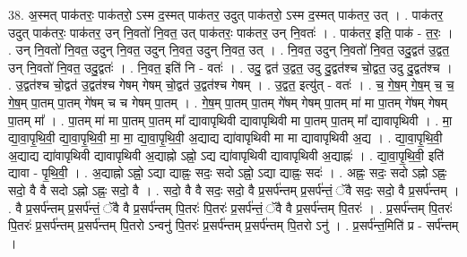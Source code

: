 \documentclass[17pt]{extarticle}
\begin{document}
38. अ॒स्मत् पाक॑तरः॒ पाक॑तरो॒ ऽस्म द॒स्मत् पाक॑तर॒ उदुत् पाक॑तरो॒ ऽस्म द॒स्मत् पाक॑तर॒ उत् । . पाक॑तर॒ उदुत् पाक॑तरः॒ पाक॑तर॒ उन् नि॒वतो॑ नि॒वत॒ उत् पाक॑तरः॒ पाक॑तर॒ उन् नि॒वतः॑ । . पाक॑तर॒ इति॒ पाक॑ - त॒रः॒ । . उन् नि॒वतो॑ नि॒वत॒ उदुन् नि॒वत॒ उदुन् नि॒वत॒ उदुन् नि॒वत॒ उत् । . नि॒वत॒ उदुन् नि॒वतो॑ नि॒वत॒ उदु॒द्वत॑ उ॒द्वत॒ उन् नि॒वतो॑ नि॒वत॒ उदु॒द्वतः॑ । . नि॒वत॒ इति॑ नि - वतः॑ । . उदु॒ द्वत॑ उ॒द्वत॒ उदु दु॒द्वत॑श्च चो॒द्वत॒ उदु दु॒द्वत॑श्च । . उ॒द्वत॑श्च चो॒द्वत॑ उ॒द्वत॑श्च गेषम् गेषम् चो॒द्वत॑ उ॒द्वत॑श्च गेषम् । . उ॒द्वत॒ इत्यु॑त् - वतः॑ । . च॒ गे॒ष॒म् गे॒ष॒म् च॒ च॒ गे॒ष॒म् पा॒तम् पा॒तम् गे॑षम् च च गेषम् पा॒तम् । . गे॒ष॒म् पा॒तम् पा॒तम् गे॑षम् गेषम् पा॒तम् मा॑ मा पा॒तम् गे॑षम् गेषम् पा॒तम् मा᳚ । . पा॒तम् मा॑ मा पा॒तम् पा॒तम् मा᳚ द्यावापृथिवी द्यावापृथिवी मा पा॒तम् पा॒तम् मा᳚ द्यावापृथिवी । . मा॒ द्या॒वा॒पृ॒थि॒वी॒ द्या॒वा॒पृ॒थि॒वी॒ मा॒ मा॒ द्या॒वा॒पृ॒थि॒वी॒ अ॒द्याद्य द्या॑वापृथिवी मा मा द्यावापृथिवी अ॒द्य । . द्या॒वा॒पृ॒थि॒वी॒ अ॒द्याद्य द्या॑वापृथिवी द्यावापृथिवी अ॒द्याह्नो ऽह्नो॒ ऽद्य द्या॑वापृथिवी द्यावापृथिवी अ॒द्याह्नः॑ । . द्या॒वा॒पृ॒थि॒वी॒ इति॑ द्यावा - पृ॒थि॒वी॒ । . अ॒द्याह्नो ऽह्नो॒ ऽद्या द्याह्नः॒ सदः॒ सदो ऽह्नो॒ ऽद्या द्याह्नः॒ सदः॑ । . अह्नः॒ सदः॒ सदो ऽह्नो ऽह्नः॒ सदो॒ वै वै सदो ऽह्नो ऽह्नः॒ सदो॒ वै । . सदो॒ वै वै सदः॒ सदो॒ वै प्र॒सर्प॑न्तम् प्र॒सर्प॑न्तं॒ ॅवै सदः॒ सदो॒ वै प्र॒सर्प॑न्तम् । . वै प्र॒सर्प॑न्तम् प्र॒सर्प॑न्तं॒ ॅवै वै प्र॒सर्प॑न्तम् पि॒तरः॑ पि॒तरः॑ प्र॒सर्प॑न्तं॒ ॅवै वै प्र॒सर्प॑न्तम् पि॒तरः॑ । . प्र॒सर्प॑न्तम् पि॒तरः॑ पि॒तरः॑ प्र॒सर्प॑न्तम् प्र॒सर्प॑न्तम् पि॒तरो ऽन्वनु॑ पि॒तरः॑ प्र॒सर्प॑न्तम् प्र॒सर्प॑न्तम् पि॒तरो ऽनु॑ । . प्र॒सर्प॑न्त॒मिति॑ प्र - सर्प॑न्तम् । \newline
\pagebreak
{}
\end{document}

